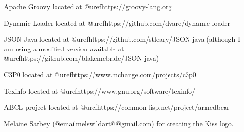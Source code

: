 Apache Groovy located at @uref{https://groovy-lang.org}

Dynamic Loader located at @uref{https://github.com/dvare/dynamic-loader}

JSON-Java located at @uref{https://github.com/stleary/JSON-java}
(although I am using a modified version available at
@uref{https://github.com/blakemcbride/JSON-java})

C3P0 located at @uref{https://www.mchange.com/projects/c3p0}

Texinfo located at @uref{https://www.gnu.org/software/texinfo/}

ABCL project located at @uref{https://common-lisp.net/project/armedbear}

Melaine Sarbey (@email{melswildart@@gmail.com}) for creating the Kiss logo.

